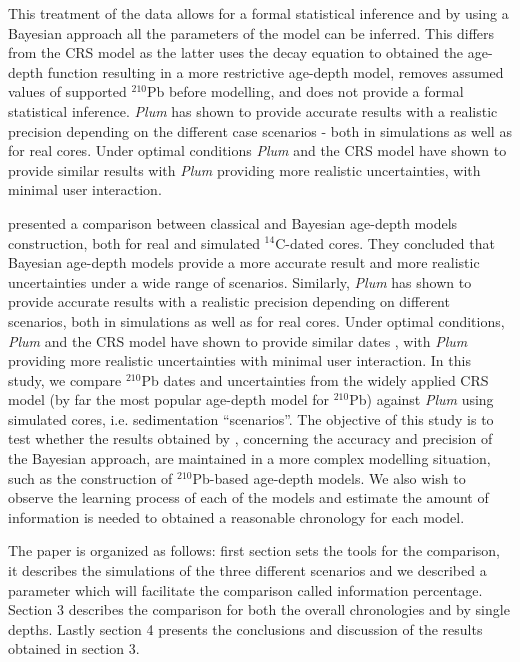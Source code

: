 \documentclass [10pt] {article}
\begin{document}
This treatment of the data allows for a formal statistical inference and by using a Bayesian approach all the parameters of the model can be inferred.
This differs from the CRS model as the latter uses the decay equation to obtained the age-depth function resulting in a more restrictive age-depth model, removes assumed values of supported $^{210}$Pb before modelling, and does not provide a formal statistical inference.
\textit{Plum} has shown to provide accurate results with a realistic precision depending on the different case scenarios \citep{Aquino2020} - both in simulations as well as for real cores.
Under optimal conditions \textit{Plum} and the CRS model have shown to provide similar results \citep{Aquino2020} with \textit{Plum} providing more realistic uncertainties, with minimal user interaction. 

\citet{Blaauw2018} presented a comparison between classical and Bayesian age-depth models construction, both for real and simulated $^{14}$C-dated cores.
They concluded that Bayesian age-depth models provide a more accurate result and more realistic uncertainties under a wide range of scenarios.  
Similarly, \textit{Plum} has shown to provide accurate results with a realistic precision depending on different scenarios, both in simulations as well as for real cores. Under optimal conditions, \textit{Plum} and the CRS model have shown to provide similar dates , with \textit{Plum} providing more realistic uncertainties with minimal user interaction. 
In this study, we compare $^{210}$Pb dates and uncertainties from the widely applied CRS model (by far the most popular age-depth model for $^{210}$Pb) against \textit{Plum} using simulated cores, i.e. sedimentation ``scenarios''.
The objective of this study is to test whether the results obtained by \citet{Blaauw2018}, concerning the accuracy and precision of the Bayesian approach, are maintained in a more complex modelling situation, such as the construction of $^{210}$Pb-based age-depth models.
We also wish to observe the learning process of each of the models and estimate the amount of information is needed to obtained a reasonable chronology for each model. 

The paper is organized as follows: first section sets the tools for the comparison, it describes the simulations of the three different scenarios and we described a parameter which will facilitate the comparison called information percentage. 
Section 3 describes the comparison for both the overall chronologies and by single depths.
Lastly section 4 presents the conclusions and discussion of the results obtained in section 3. 
\end{document}
